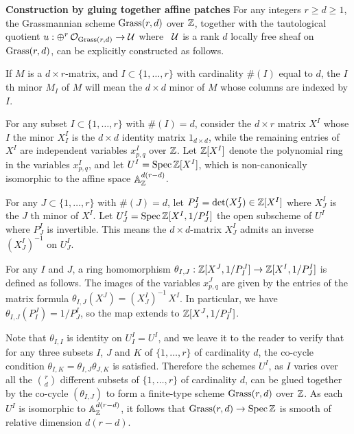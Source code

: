 \begin{construction}\label{nhq-grassmannian-construction}
\textbf{Construction by gluing together affine patches }
For any integers $r\ge d\ge 1$, the Grassmannian scheme
$\operatorname{Grass}(r,d)$ over $\mathbb{Z}$, together with the tautological
quotient $u:\oplus^r\,{\mathcal O}_{\operatorname{Grass}(r,d)} \to \mathcal{U}$ where \
$\mathcal{U}$ is a rank $d$ locally free sheaf on $\operatorname{Grass}(r,d)$,
can be explicitly constructed as follows.



If $M$ is a $d\times r$-matrix, and
$I\subset \{1,\ldots, r\}$ with cardinality $\#(I)$ equal
to $d$, the $I$ th minor $M_I$ of $M$ will
mean the $d\times d$ minor of $M$ whose columns are indexed by
$I$.


For any subset $I\subset \{1,\ldots, r\}$ with $\#(I) =d$,
consider the $d\times r$ matrix $X^I$ whose $I$ the minor
$X^I_I$ is the $d\times d$ identity matrix $1_{d\times d}$, while the remaining
entries of $X^I$ are independent variables $x^I_{p,q}$ over $\mathbb{Z}$.
Let $\mathbb{Z}[X^I]$ denote the polynomial ring in the variables
$x^I_{p,q}$, and let $U^I = \operatorname{Spec} \mathbb{Z}[X^I]$, which is non-canonically
isomorphic to the affine space $\mathbb{A}^{d(r-d)}_{\mathbb{Z}}$.

For any $J\subset \{1,\ldots, r\}$ with $\#(J) =d$, let
$P^I_J = \det(X^I_J) \in \mathbb{Z}[X^I]$
where $X^I_J$ is the $J$ th minor of $X^I$.
Let $U^I_J = \operatorname{Spec} \mathbb{Z}[X^I, 1/P^I_J]$
the open subscheme of $U^I$ where $P^I_J$ is invertible. This means
the $d\times d$-matrix $X^I_J$ admits an inverse $(X^I_J)^{-1}$
on $U^I_J$.

For any $I$ and $J$, a ring homomorphism
$\theta_{I,J} : \mathbb{Z}[X^J, 1/P^J_I] \to \mathbb{Z}[X^I, 1/P^I_J]$ is
defined as follows. The images of the variables
$x^J_{p,q}$ are given by the entries of the matrix formula
$\theta_{I,J}(X^J) = (X^I_J) ^{-1}\,X^I$.
In particular, we have $\theta_{I,J}(P^J_I) = 1/P^I_J$,
so the map extends to $\mathbb{Z}[X^J, 1/P^J_I]$.

Note that $\theta_{I,I}$ is identity on $U^I_I = U^I$, and
we leave it to the reader to verify that \notready
for any three subsets $I$, $J$ and $K$ of $\{ 1,\ldots, r\}$ of
cardinality $d$, the co-cycle condition
$\theta_{I,K}= \theta_{I,J}\theta_{J,K}$
is satisfied. Therefore the schemes
$U^I$, as $I$ varies over all the
${r\choose d}$ different
subsets of  $\{ 1,\ldots, r\}$ of cardinality $d$,
can be glued together by the co-cycle $(\theta_{I,J})$ to form a
finite-type scheme $\operatorname{Grass}(r,d)$ over $\mathbb{Z}$. As each $U^I$ is
isomorphic to $\mathbb{A}^{d(r-d)}_{\mathbb{Z}}$, it follows that
$\operatorname{Grass}(r,d) \to \operatorname{Spec} \mathbb{Z}$ is smooth of relative dimension $d(r-d)$.




\end{construction}
